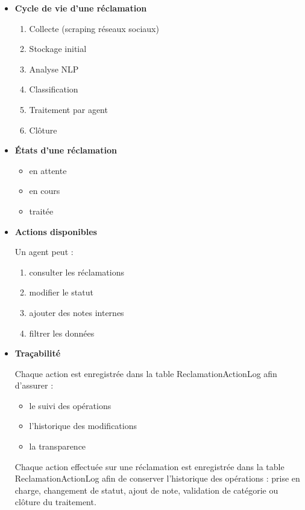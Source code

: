 \documentclass[12pt,a4paper,oneside]{report}
\begin{document}
\begin{itemize}
    \item \textbf{Cycle de vie d’une réclamation}

    \begin{enumerate}
        \item Collecte (scraping réseaux sociaux)
        \item Stockage initial
        \item Analyse NLP
        \item Classification
        \item Traitement par agent
        \item Clôture
    \end{enumerate}

\end{itemize}

\begin{itemize}
    \item \textbf{États d’une réclamation}
    \begin{itemize}
        \item en attente
        \item en cours
        \item traitée
    \end{itemize}
\end{itemize}

\begin{itemize}
    \item \textbf{Actions disponibles}

    Un agent peut :
    
    \begin{enumerate}
        \item consulter les réclamations
        \item modifier le statut
        \item ajouter des notes internes
        \item filtrer les données
    \end{enumerate}
\end{itemize}

\begin{itemize}
    \item \textbf{Traçabilité}

    Chaque action est enregistrée dans la table ReclamationActionLog afin d’assurer :
    
    \begin{itemize}
        \item le suivi des opérations
        \item l’historique des modifications
        \item la transparence
    \end{itemize}
    
    Chaque action effectuée sur une réclamation est enregistrée dans la table ReclamationActionLog afin de conserver l’historique des opérations : prise en charge, changement de statut, ajout de note, validation de catégorie ou clôture du traitement.

\end{itemize}
\end{document}
